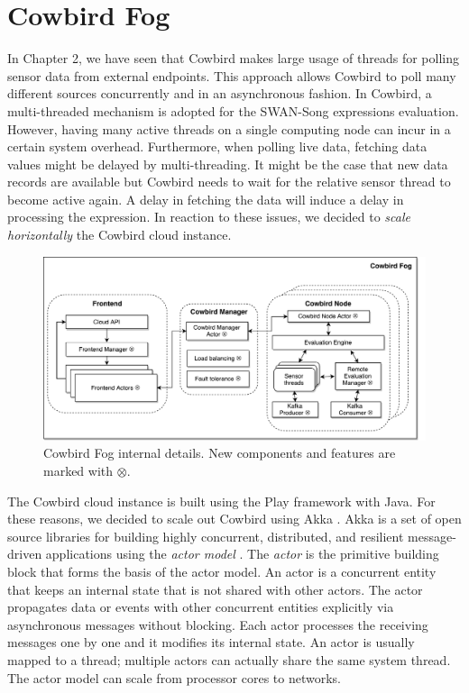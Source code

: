\section{Cowbird Fog}
In Chapter 2, we have seen that Cowbird makes large usage of threads for polling sensor data from external endpoints. This approach allows Cowbird to poll many different sources concurrently and in an asynchronous fashion. In Cowbird, a multi-threaded mechanism is adopted for the SWAN-Song expressions evaluation. However, having many active threads on a single computing node can incur in a certain system overhead. Furthermore, when polling live data, fetching data values might be delayed by multi-threading. It might be the case that new data records are available but Cowbird needs to wait for the relative sensor thread to become active again. A delay in fetching the data will induce a delay in processing the expression. In reaction to these issues, we decided to \emph{scale horizontally} the Cowbird cloud instance. 

 \begin{figure}[h!]
\includegraphics[width=1\textwidth]{images/fog_internals.pdf}
 \caption{Cowbird Fog internal details. New components and features are marked with $\otimes$.}
\label{fig:fog_internals}
\end{figure}

The Cowbird cloud instance is built using the Play framework with Java. For these reasons, we decided to scale out Cowbird using Akka \cite{akkaonline}. Akka is a set of open source libraries for building highly concurrent, distributed, and resilient message-driven applications using the \emph{actor model} \cite{actormodelbook}. The \emph{actor} is the primitive building block that forms the basis of the actor model. An actor is a concurrent entity that keeps an internal state that is not shared with other actors. The actor propagates data or events with other concurrent entities explicitly via asynchronous messages without blocking. Each actor processes the receiving messages one by one and it modifies its internal state. An actor is usually mapped to a thread; multiple actors can actually share the same system thread. The actor model can scale from processor cores to networks.

